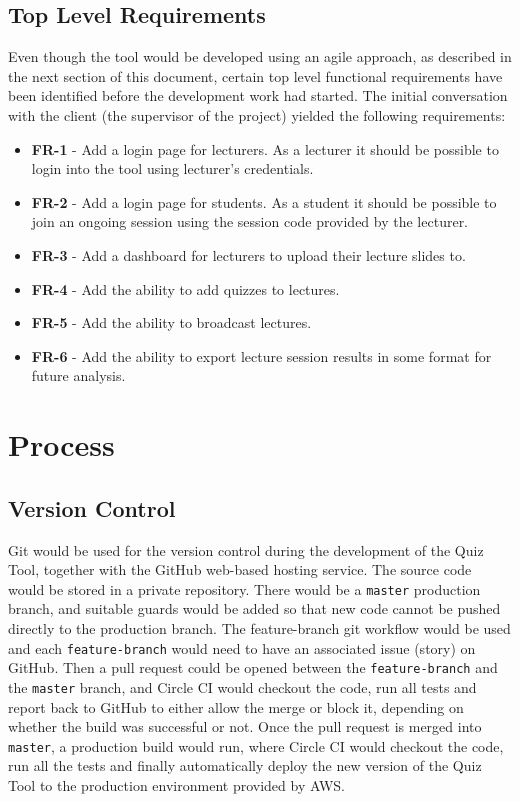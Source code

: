 \subsection{Top Level Requirements}
\label{subsection:toplevel}
Even though the tool would be developed using an agile approach, as described in the next
section of this document, certain top level functional requirements have been identified
before the development work had started. The initial conversation with the client (the
supervisor of the project) yielded the following requirements:

\begin{itemize}
  \item \textbf{FR-1} - Add a login page for lecturers. As a lecturer it should be possible to login
  into the tool using lecturer's credentials.
  \item \textbf{FR-2} - Add a login page for students. As a student it should be possible to join
  an ongoing session using the session code provided by the lecturer.
  \item \textbf{FR-3} - Add a dashboard for lecturers to upload their lecture slides to.
  \item \textbf{FR-4} - Add the ability to add quizzes to lectures.
  \item \textbf{FR-5} - Add the ability to broadcast lectures.
  \item \textbf{FR-6} - Add the ability to export lecture session results in some format
  for future analysis.
\end{itemize}

\section{Process}
\subsection{Version Control}
\label{subsection:versioncontrol}
Git\cite{29} would be used for the version control during the development of the Quiz Tool, together with
the GitHub\cite{30} web-based hosting service. The source code would be stored in a private
repository. There would be a \texttt{master} production branch, and suitable guards would be added
so that new code cannot be pushed directly to the production branch. The feature-branch git
workflow\cite{31} would be used and each \texttt{feature-branch} would need to have an associated issue
(story) on GitHub. Then a pull request could be opened between the \texttt{feature-branch} and the \texttt{master}
branch, and Circle CI would checkout the code, run all tests and report back to GitHub to either
allow the merge or block it, depending on whether the build was successful or not. Once the pull request
is merged into \texttt{master}, a production build would run, where Circle CI would checkout the code, run
all the tests and finally automatically deploy the new version of the Quiz Tool to the production
environment provided by AWS.

